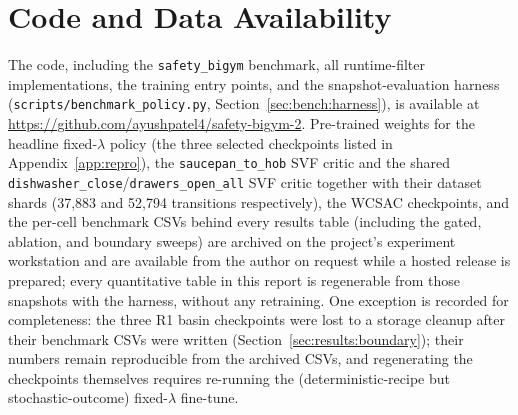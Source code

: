\documentclass[11pt,a4paper]{report}
\newcommand{\sbigym}{\texttt{safety\_bigym}}
\begin{document}
\chapter{Code and Data Availability}
\label{app:data}

The code, including the \sbigym{} benchmark, all runtime-filter
implementations, the training entry points, and the
snapshot-evaluation harness
(\texttt{scripts/benchmark\_policy.py},
Section~\ref{sec:bench:harness}), is available at
\url{https://github.com/ayushpatel4/safety-bigym-2}. Pre-trained weights for
the headline fixed-$\lambda$ policy (the three selected checkpoints
listed in Appendix~\ref{app:repro}), the \texttt{saucepan\_to\_hob}
SVF critic and the shared \texttt{dishwasher\_close}/\texttt{drawers\_open\_all}
SVF critic together with their dataset shards
(37{,}883 and 52{,}794 transitions respectively), the WCSAC
checkpoints, and the per-cell benchmark CSVs behind every results
table (including the gated, ablation, and boundary sweeps) are
archived on the project's experiment workstation and are available
from the author on request while a hosted release is prepared; every
quantitative table in this report is regenerable from those
snapshots with the harness, without any retraining. One exception is
recorded for completeness: the three R1 basin checkpoints were lost
to a storage cleanup after their benchmark CSVs were written
(Section~\ref{sec:results:boundary}); their numbers remain
reproducible from the archived CSVs, and regenerating the
checkpoints themselves requires re-running the (deterministic-recipe
but stochastic-outcome) fixed-$\lambda$ fine-tune.


\end{document}
